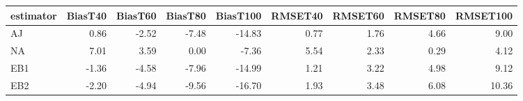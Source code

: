 \begin{table}[ht]
\centering
\begin{tabular}{lrrrrrrrr}
  \toprule
estimator & BiasT40 & BiasT60 & BiasT80 & BiasT100 & RMSET40 & RMSET60 & RMSET80 & RMSET100 \\ 
  \midrule
AJ & 0.86 & -2.52 & -7.48 & -14.83 & 0.77 & 1.76 & 4.66 & 9.00 \\ 
  NA & 7.01 & 3.59 & 0.00 & -7.36 & 5.54 & 2.33 & 0.29 & 4.12 \\ 
  EB1 & -1.36 & -4.58 & -7.96 & -14.99 & 1.21 & 3.22 & 4.98 & 9.12 \\ 
  EB2 & -2.20 & -4.94 & -9.56 & -16.70 & 1.93 & 3.48 & 6.08 & 10.36 \\ 
   \bottomrule
\end{tabular}
\end{table}
